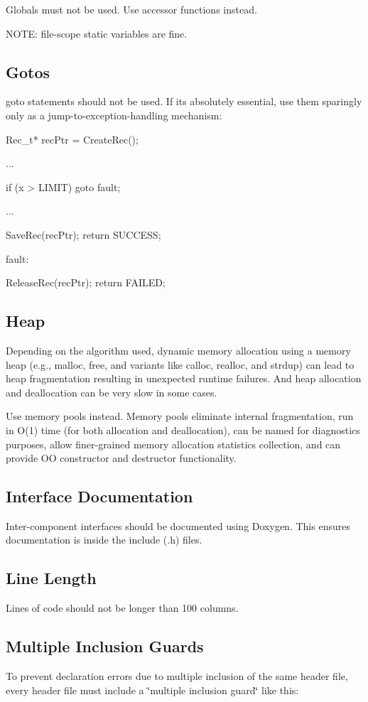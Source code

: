 Globals must not be used. Use accessor functions instead.

N\+O\+T\+E\+: file-\/scope static variables are fine.\hypertarget{ccoding_stds_main_cstdsGotos}{}\subsection{Gotos}\label{ccoding_stds_main_cstdsGotos}
{\ttfamily goto} statements should not be used. If it\textquotesingle{}s absolutely essential, use them sparingly only as a jump-\/to-\/exception-\/handling mechanism\+:

\begin{DoxyVerb}{
    Rec_t* recPtr = CreateRec();

    ...

    if (x > LIMIT)
    {
        goto fault;
    }

    ...

    SaveRec(recPtr);
    return SUCCESS;

fault:

    ReleaseRec(recPtr);
    return FAILED;
}\end{DoxyVerb}
\hypertarget{ccoding_stds_main_cstdsHeap}{}\subsection{Heap}\label{ccoding_stds_main_cstdsHeap}
Depending on the algorithm used, dynamic memory allocation using a memory heap (e.\+g., malloc, free, and variants like calloc, realloc, and strdup) can lead to heap fragmentation resulting in unexpected runtime failures. And heap allocation and deallocation can be very slow in some cases.

Use memory pools instead. Memory pools eliminate internal fragmentation, run in O(1) time (for both allocation and deallocation), can be named for diagnostics purposes, allow finer-\/grained memory allocation statistics collection, and can provide O\+O constructor and destructor functionality.\hypertarget{ccoding_stds_main_cstdsInterfaceDocumentation}{}\subsection{Interface Documentation}\label{ccoding_stds_main_cstdsInterfaceDocumentation}
Inter-\/component interfaces should be documented using Doxygen. This ensures documentation is inside the include (.h) files.\hypertarget{ccoding_stds_main_cstdsLineLength}{}\subsection{Line Length}\label{ccoding_stds_main_cstdsLineLength}
Lines of code should not be longer than 100 columns.\hypertarget{ccoding_stds_main_cstdsMultipleInclusionGuards}{}\subsection{Multiple Inclusion Guards}\label{ccoding_stds_main_cstdsMultipleInclusionGuards}
To prevent declaration errors due to multiple inclusion of the same header file, every header file must include a \char`\"{}multiple inclusion guard\char`\"{} like this\+:


